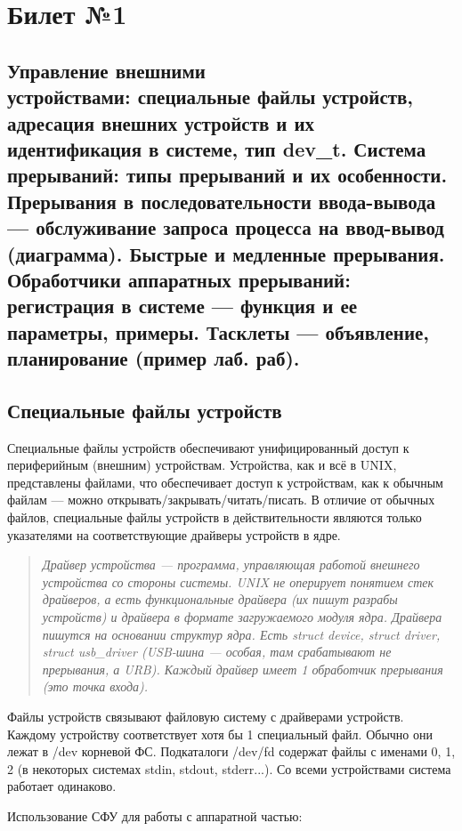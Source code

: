 \chapter{Билет №1}

\section*{Управление внешними \\ устройствами: специальные файлы устройств, адресация внешних устройств и их идентификация в системе, тип dev\_t. Система прерываний: типы прерываний и их особенности. Прерывания в последовательности ввода-вывода --- обслуживание запроса процесса на ввод-вывод (диаграмма). Быстрые и медленные прерывания. Обработчики аппаратных прерываний: регистрация в системе --- функция и ее параметры, примеры. Тасклеты --- объявление, планирование (пример лаб. раб).}

\section{Специальные файлы устройств}
Специальные файлы устройств обеспечивают унифицированный доступ к периферийным (внешним) устройствам. Устройства, как и всё в UNIX, представлены файлами, что обеспечивает доступ к устройствам, как к обычным файлам --- можно открывать/закрывать/читать/писать. В отличие от обычных файлов, специальные файлы устройств в действительности являются только указателями на соответствующие драйверы устройств в ядре.

\begin{quote}
	\textit{Драйвер устройства --- программа, управляющая работой внешнего устройства со стороны системы. UNIX не оперирует понятием стек драйверов, а есть функциональные драйвера (их пишут разрабы устройств) и драйвера в формате загружаемого модуля ядра. Драйвера пишутся на основании структур ядра. Есть struct device, struct driver, struct usb\_driver (USB-шина --- особая, там срабатывают не прерывания, а URB). Каждый драйвер имеет 1 обработчик прерывания (это точка входа). }
\end{quote}

 Файлы устройств связывают файловую систему с драйверами устройств. Каждому устройству соответствует хотя бы 1 специальный файл. Обычно они лежат в /dev корневой ФС. Подкаталоги /dev/fd содержат файлы с именами 0, 1, 2 (в некоторых системах stdin, stdout, stderr...). Со всеми устройствами система работает одинаково.

Использование СФУ для работы с аппаратной частью:

